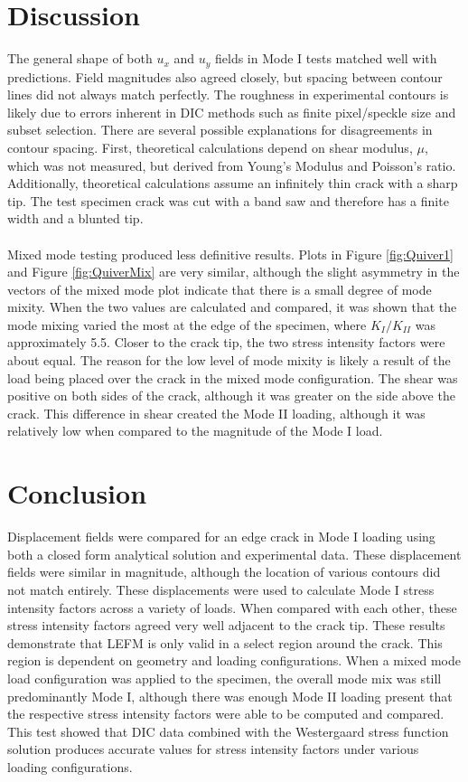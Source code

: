 \documentclass[12pt]{article}
\begin{document}
\section{Discussion}%
The general shape of both $u_x$ and $u_y$ fields in Mode I tests matched well with predictions. Field magnitudes also agreed closely, but spacing between contour lines did not always match perfectly. The roughness in experimental contours is likely due to errors inherent in DIC methods such as finite pixel/speckle size and subset selection. There are several possible explanations for disagreements in contour spacing. First, theoretical calculations depend on shear modulus, $\mu$, which was not measured, but derived from Young's Modulus and Poisson's ratio. Additionally, theoretical calculations assume an infinitely thin crack with a sharp tip. The test specimen crack was cut with a band saw and therefore has a finite width and a blunted tip. 
\\ \\
Mixed mode testing produced less definitive results. Plots in Figure \ref{fig:Quiver1} and Figure \ref{fig:QuiverMix} are very similar, although the slight asymmetry in the vectors of the mixed mode plot indicate that there is a small degree of mode mixity. When the two values are calculated and compared, it was shown that the mode mixing varied the most at the edge of the specimen, where $K_I/K_{II}$ was approximately 5.5. Closer to the crack tip, the two stress intensity factors were about equal. The reason for the low level of mode mixity is likely a result of the load being placed over the crack in the mixed mode configuration. The shear was positive on both sides of the crack, although it was greater on the side above the crack. This difference in shear created the Mode II loading, although it was relatively low when compared to the magnitude of the Mode I load.

\section{Conclusion}%

Displacement fields were compared for an edge crack in Mode I loading using both a closed form analytical solution and experimental data. These displacement fields were similar in magnitude, although the location of various contours did not match entirely. These displacements were used to calculate Mode I stress intensity factors across a variety of loads. When compared with each other, these stress intensity factors agreed very well adjacent to the crack tip. These results demonstrate that LEFM is only valid in a select region around the crack. This region is dependent on geometry and loading configurations. When a mixed mode load configuration was applied to the specimen, the overall mode mix was still predominantly Mode I, although there was enough Mode II loading present that the respective stress intensity factors were able to be computed and compared. This test showed that DIC data combined with the Westergaard stress function solution produces accurate values for stress intensity factors under various loading configurations.
\end{document}
